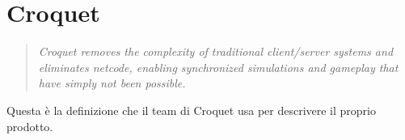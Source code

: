 \section{Croquet}\label{sec:Croquet}
\begin{quote}
    \textit{Croquet removes the complexity of traditional client/server systems and eliminates netcode, enabling synchronized simulations and gameplay that have simply not been 
    possible.}\cite{Croquet}
\end{quote}
Questa è la definizione che il team di Croquet usa per descrivere il proprio prodotto. 